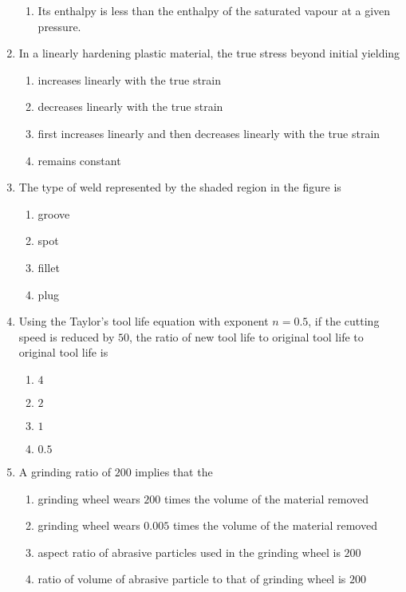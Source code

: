 \documentclass[journal,12pt,onecolumn]{IEEEtran}
\theoremstyle{remark}
\begin{document}
\begin{enumerate}
\begin{enumerate}
        \item Its enthalpy is less than the enthalpy of the saturated vapour at a given pressure.
    \end{enumerate}
    \item In a linearly hardening plastic material, the true stress beyond initial yielding 
    \begin{enumerate}
        \item increases linearly with the true strain
        \item decreases linearly with the true strain
        \item first increases linearly and then decreases linearly with the true strain
        \item remains constant
    \end{enumerate}
    \item The type of weld represented by the shaded region in the figure is \\ 
    
    \begin{enumerate}
        \item groove
        \item spot
        \item fillet
        \item plug
    \end{enumerate}
    \item Using the Taylor's tool life equation with exponent $n=0.5$, if the cutting speed is reduced by $50$, the ratio of new tool life to original tool life to original tool life is 
    \begin{enumerate}
        \item $4$
        \item $2$
        \item $1$
        \item $0.5$
    \end{enumerate}
    \item A grinding ratio of $200$ implies that the 
    \begin{enumerate}
        \item grinding wheel wears $200$ times the volume of the material removed
        \item grinding wheel wears $0.005$ times the volume of the material removed
        \item aspect ratio of abrasive particles used in the grinding wheel is $200$
        \item ratio of volume of abrasive particle to that of grinding wheel is $200$

\end{enumerate}
\end{enumerate}
\end{document}
